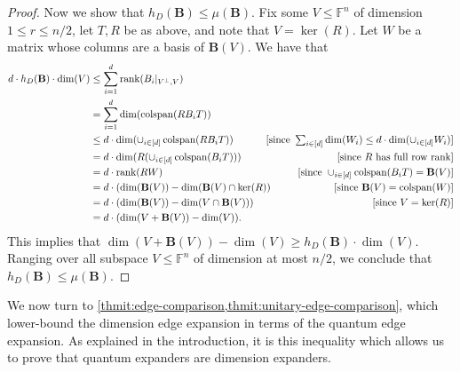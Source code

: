\documentclass{toc}
\theoremstyle{plain}
\numberwithin{equation}{section}
\theoremstyle{definition}
\newcommand{\F}{\mathbb{F}}
\newcommand{\rk}{\mathrm{rank}}
\newcommand{\tuple}[1]{\mathbf{#1}}
\newcommand{\vB}{\tuple{B}}
\newcommand{\colspan}{\operatorname{colspan}}
\newcommand{\ann}{V^{\perp}}
\DeclareMathOperator{\rank}{rank}
\begin{document}
\begin{proof}
  Now we show that $ h_D(\vB)\leq \mu(\vB)$. Fix some $V\leq \F^n$ of dimension $1\leq r\leq n/2$, let $T,R$ be as above, and note that $V=\ker(R)$. Let $W$ be a matrix whose columns are a basis of $\vB(V)$. 
  We have that
%
%
  \begin{align*}
    d\cdot h_D(\vB)\cdot\dim(V)  &\leq  \sum_{i=1}^d\rk(B_i|_{\ann, V}) \\
    & =  \sum_{i=1}^d\dim(\colspan(RB_iT)) \\
    & \leq d\cdot\dim(\cup_{i\in[d]}\colspan(RB_iT)) & \hspace{-14.6pt}[\text{since }\textstyle\sum_{i\in[d]}\dim(W_i)\leq d\cdot \dim(\cup_{i\in[d]}W_i) ]\\
    & =  d\cdot\dim(R(\cup_{i\in[d]}\colspan(B_iT)))& [\text{since }R\text{ has full row rank} ]\\
    & =  d\cdot\rank(RW) &[\text{since }\cup_{i\in[d]} \colspan(B_iT)=\vB(V) ]\\
    & =  d\cdot(\dim(\vB(V))-\dim(\vB(V) \cap \ker(R)) & [\text{since }\vB(V)=\colspan(W)]\\
    & =  d\cdot(\dim(\vB(V))-\dim(V\cap\vB(V))) & [\text{since }V=\ker(R)]\\
    & =  d\cdot(\dim(V+\vB(V))-\dim(V)).
  \end{align*}
  This implies that $\dim(V+\vB(V))-\dim (V)\geq h_D(\vB)\cdot \dim(V)$. Ranging over all subspace $V\leq\F^n$ of dimension at most $n/2$,
  we conclude that $ h_D(\vB)\leq \mu(\vB)$.
\end{proof} 
We now turn to \cref{thmit:edge-comparison,thmit:unitary-edge-comparison}, which lower-bound the dimension edge expansion in terms of the quantum edge expansion. As explained in the introduction, it is this inequality which allows us to prove that quantum expanders are dimension expanders.
\end{document}
